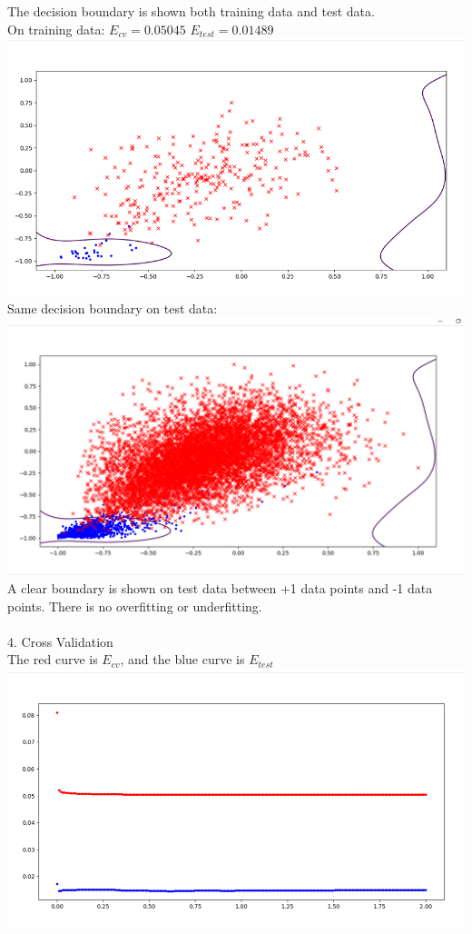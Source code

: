 \documentclass[12pt]{article}
\begin{document}
The decision boundary is shown both training data and test data. \\
On training data: $E_{cv}=0.05045$ $E_{test}=0.01489$\\
\includegraphics[scale=0.5]{images/lambda_2_train}\\
Same decision boundary on test data:\\
\includegraphics[scale=0.5]{images/lambda_2_test}\\
A clear boundary is shown on test data between +1 data points and -1 data points. There is no overfitting or underfitting. \\\\
4. Cross Validation\\
The red curve is $E_{cv}$, and the blue curve is $E_{test}$\\
\includegraphics[scale=0.5]{images/ecv_vs_etest}\\
\end{document}
